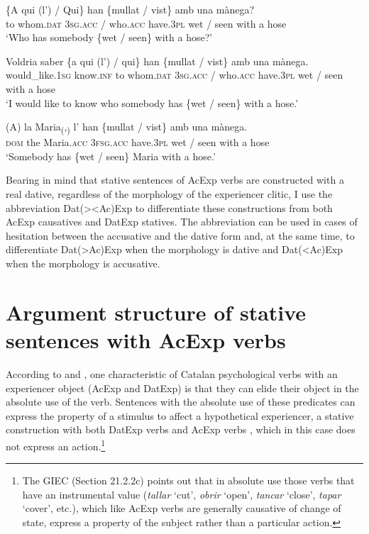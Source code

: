 \documentclass[output=paper,colorlinks,citecolor=brown,modfonts,nonflat]{langsci/langscibook}
\begin{document}
{{ \ex \label{ex:royo:17c}
 \gll \{A qui (l’) / Qui\} han \{mullat / vist\} amb una mànega?\\
 to whom.\textsc{dat} \textsc{3sg.acc} / who.\textsc{acc} have.\textsc{3pl} wet / seen with a hose\\
\glt ‘Who has somebody \{wet / seen\} with a hose?’

 \ex \label{ex:royo:17d}
 \gll Voldria saber \{a qui (l’) / qui\} han \{mullat / vist\} amb una mànega.\\
 would\_like.\textsc{1sg} know.\textsc{inf} to whom.\textsc{dat} \textsc{3sg.acc} / who.\textsc{acc} have.\textsc{3pl} wet / seen with a hose\\
\glt ‘I would like to know who somebody has \{wet / seen\} with a hose.’

 \ex \label{ex:royo:17e}
 \gll (A) la Maria\textsubscript{(},\textsubscript{)} l’ han \{mullat / vist\} amb una mànega.\\
 \textsc{dom} the Maria.\textsc{acc} \textsc{3fsg.acc} have.\textsc{3pl} wet / seen with a hose\\
\glt ‘Somebody has \{wet / seen\} Maria with a hose.’

 \z
 \z

Bearing in mind that stative sentences of AcExp verbs are constructed with a real dative, regardless of the morphology of the experiencer clitic, I use the abbreviation Dat(>{\textbar}<Ac)Exp to differentiate these constructions from both AcExp causatives and DatExp statives. The abbreviation can be used in cases of hesitation between the accusative and the dative form and, at the same time, to differentiate Dat(>Ac)Exp when the morphology is dative and Dat(<Ac)Exp when the morphology is accusative.

\section{Argument structure of stative sentences with AcExp verbs}\label{sec:royo:5}

According to \citet[Sections 13.3.6.2a-b and 13.3.7.2b]{Rossello2008} and \citet[21.2.2b and 21.5a]{GIEC2016}, one characteristic of Catalan psychological verbs with an experiencer object (AcExp and DatExp) is that they can elide their object in the absolute use of the verb. Sentences with the absolute use of these predicates can express the property of a stimulus to affect a hypothetical experiencer, a stative construction with both DatExp verbs  and AcExp verbs , which in this case does not express an action.\footnote{The GIEC (Section 21.2.2c) points out that in absolute use those verbs that have an instrumental value (\textit{tallar} ‘cut’, \textit{obrir} ‘open’, \textit{tancar} ‘close’, \textit{tapar} ‘cover’, etc.), which like AcExp verbs are generally causative of change of state, express a property of the subject rather than a particular action.}

}}
\end{document}

